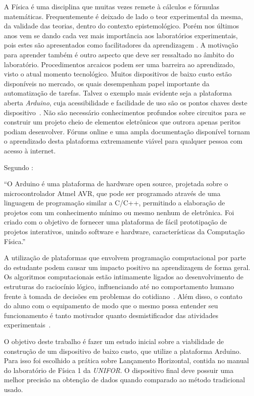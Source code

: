 \documentclass[article,11pt,a4paper]{abntex2}
\begin{document}
A Física é uma disciplina que muitas vezes remete à cálculos e fórmulas matemáticas.
Frequentemente é deixado de lado o teor experimental da mesma, da validade das teorias, dentro do contexto epistemológico.
Porém nos últimos anos vem se dando cada vez mais importância aos laboratórios experimentais, pois estes são apresentados como facilitadores da aprendizagem
\cite{Grandini_2004, Marineli_2006, Souza_2011, RodriguesCunha2014}.
A motivação para aprender também é outro aspecto que deve ser ressaltado no âmbito do laboratório.
Procedimentos arcaicos podem ser uma barreira ao aprendizado, visto o atual momento tecnológico.
Muitos dispositivos de baixo custo estão disponíveis no mercado, os quais desempenham papel importante da automatização de tarefas.
Talvez o exemplo mais evidente seja a plataforma aberta \emph{Arduino}, cuja acessibilidade e facilidade de uso são os pontos chaves deste dispositivo~\cite{OliveiraZanetti2015}.
Não são necessário conhecimentos profundos sobre circuitos para se construir um projeto cheio de elementos eletrônicos que outrora apenas peritos podiam desenvolver.
Fóruns online e uma ampla documentação disponível tornam o aprendizado desta plataforma extremamente viável para qualquer pessoa com acesso à internet.


Segundo \textcite{OliveiraZanetti2015}:
\begin{citacao}
``O Arduino é uma plataforma de hardware open source, projetada sobre o microcontrolador Atmel AVR, que pode ser programado através de uma linguagem de programação similar a C/C++, permitindo a elaboração de projetos com um conhecimento mínimo ou mesmo nenhum de eletrônica.
Foi criado com o objetivo de fornecer uma plataforma de fácil prototipação de projetos interativos, unindo software e hardware, características da Computação Física.''
\end{citacao}


A utilização de plataformas que envolvem programação computacional por parte do estudante podem causar um impacto positivo na aprendizagem de forma geral.
Os algoritmos computacionais estão intimamente ligados ao desenvolvimento de estruturas do raciocínio lógico, influenciando até no comportamento humano frente à tomada de decisões em problemas do cotidiano~\cite{Wing_2008, Zanetti_2015}.
Além disso, o contato do aluno com o equipamento de modo que o mesmo possa entender seu funcionamento é tanto motivador quanto desmistificador das atividades experimentais~\cite{Rosa2003}.

O objetivo deste trabalho é fazer um estudo inicial sobre a viabilidade de construção de um dispositivo de baixo custo, que utilize a plataforma Arduino.
Para isso foi escolhido a prática sobre Lançamento Horizontal, contida no manual do laboratório de Física 1 da \emph{UNIFOR}.
O dispositivo final deve possuir uma melhor precisão na obtenção de dados quando comparado ao método tradicional usado.
\end{document}

